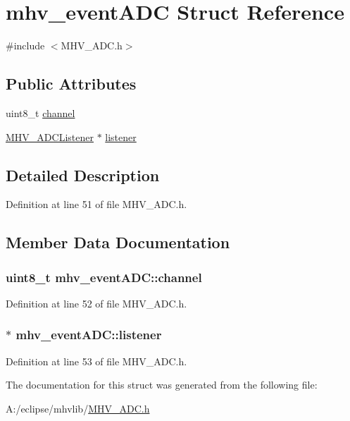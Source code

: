 \hypertarget{structmhv__event_a_d_c}{
\section{mhv\-\_\-event\-A\-D\-C \-Struct \-Reference}
\label{structmhv__event_a_d_c}
}


{\ttfamily \#include $<$\-M\-H\-V\-\_\-\-A\-D\-C.\-h$>$}

\subsection*{\-Public \-Attributes}
\begin{DoxyCompactItemize}
\item 
uint8\-\_\-t \hyperlink{structmhv__event_a_d_c_a13a4b46fc8e0f834db4846a28a13cbd5}{channel}
\item 
\hyperlink{class_m_h_v___a_d_c_listener}{\-M\-H\-V\-\_\-\-A\-D\-C\-Listener} $\ast$ \hyperlink{structmhv__event_a_d_c_a3688f1e9b5f4662afc7e892967229e46}{listener}
\end{DoxyCompactItemize}


\subsection{\-Detailed \-Description}


\-Definition at line 51 of file \-M\-H\-V\-\_\-\-A\-D\-C.\-h.



\subsection{\-Member \-Data \-Documentation}
\hypertarget{structmhv__event_a_d_c_a13a4b46fc8e0f834db4846a28a13cbd5}{
\subsubsection[{channel}]{\setlength{\rightskip}{0pt plus 5cm}uint8\-\_\-t {\bf mhv\-\_\-event\-A\-D\-C\-::channel}}}
\label{structmhv__event_a_d_c_a13a4b46fc8e0f834db4846a28a13cbd5}


\-Definition at line 52 of file \-M\-H\-V\-\_\-\-A\-D\-C.\-h.

\hypertarget{structmhv__event_a_d_c_a3688f1e9b5f4662afc7e892967229e46}{
\subsubsection[{listener}]{$\ast$ {\bf mhv\-\_\-event\-A\-D\-C\-::listener}}}
\label{structmhv__event_a_d_c_a3688f1e9b5f4662afc7e892967229e46}


\-Definition at line 53 of file \-M\-H\-V\-\_\-\-A\-D\-C.\-h.



\-The documentation for this struct was generated from the following file\-:\begin{DoxyCompactItemize}
\item 
\-A\-:/eclipse/mhvlib/\hyperlink{_m_h_v___a_d_c_8h}{\-M\-H\-V\-\_\-\-A\-D\-C.\-h}\end{DoxyCompactItemize}
